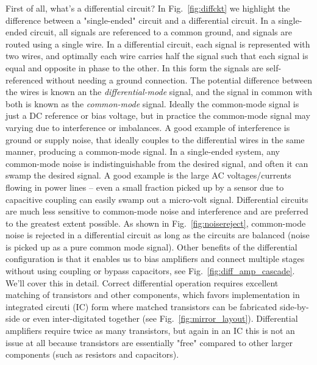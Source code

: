 First of all, what's a differential circuit?  In Fig.~\ref{fig:diffckt} we highlight the difference between a "single-ended" circuit and a differential circuit. In a single-ended circuit, all signals are referenced to a common ground, and signals are routed using a single wire.  In a differential circuit, each signal is represented with two wires, and optimally each wire carries half the signal such that each signal is equal and opposite in phase to the other.  In this form the signals are self-referenced without needing a ground connection.   The potential difference between the wires is known an the \emph{differential-mode} signal, and the signal in common with both is known as the \emph{common-mode} signal.  Ideally the common-mode signal is just a DC reference or bias voltage, but in practice the common-mode signal may varying due to interference or imbalances.  A good example of interference is ground or supply noise, that ideally couples to the differential wires in the same manner, producing a common-mode signal.  In a single-ended system, any common-mode noise is indistinguishable from the desired signal, and often it can swamp the desired signal.  A good example is the large AC voltages/currents flowing in power lines -- even a small fraction picked up by a sensor due to capacitive coupling can easily swamp out a micro-volt signal.  
Differential circuits are much less sensitive to common-mode noise and interference and are preferred to the greatest extent possible.  As shown in Fig.~\ref{fig:noisereject}, common-mode noise is rejected in a differential circuit as long as the circuits are balanced (noise is picked up as a pure common mode signal).  Other benefits of the differential configuration is that it enables us to bias amplifiers and connect multiple stages without using coupling or bypass capacitors, see Fig.~\ref{fig:diff_amp_cascade}.  We'll cover this in detail.  
Correct differential operation requires excellent matching of transistors and other components, which favors implementation in integrated circuti (IC) form where matched transistors can be fabricated side-by-side or even inter-digitated together (see Fig.~\ref{fig:mirror_layout}).  Differential amplifiers require twice as many transistors, but again in an IC this is not an issue at all because transistors are essentially "free" compared to other larger components (such as resistors and capacitors).
